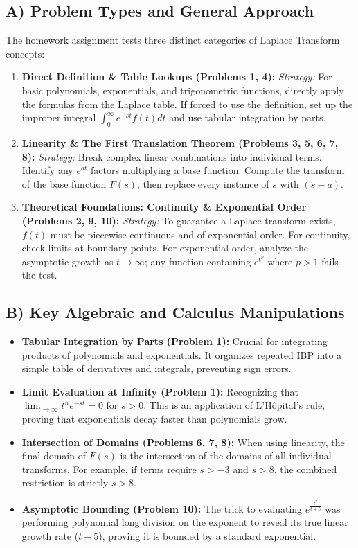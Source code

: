 \documentclass[11pt, a4paper]{article}
\theoremstyle{definition}
\theoremstyle{remark}
\begin{document}
\subsection{A) Problem Types and General Approach}
The homework assignment tests three distinct categories of Laplace Transform concepts:
\begin{enumerate}
    \item \textbf{Direct Definition \& Table Lookups (Problems 1, 4):} 
    \textit{Strategy:} For basic polynomials, exponentials, and trigonometric functions, directly apply the formulas from the Laplace table. If forced to use the definition, set up the improper integral $\int_0^\infty e^{-st}f(t)dt$ and use tabular integration by parts.
    \item \textbf{Linearity \& The First Translation Theorem (Problems 3, 5, 6, 7, 8):}
    \textit{Strategy:} Break complex linear combinations into individual terms. Identify any $e^{at}$ factors multiplying a base function. Compute the transform of the base function $F(s)$, then replace every instance of $s$ with $(s-a)$.
    \item \textbf{Theoretical Foundations: Continuity \& Exponential Order (Problems 2, 9, 10):}
    \textit{Strategy:} To guarantee a Laplace transform exists, $f(t)$ must be piecewise continuous and of exponential order. For continuity, check limits at boundary points. For exponential order, analyze the asymptotic growth as $t \to \infty$; any function containing $e^{t^p}$ where $p > 1$ fails the test.
\end{enumerate}

\subsection{B) Key Algebraic and Calculus Manipulations}
\begin{itemize}
    \item \textbf{Tabular Integration by Parts (Problem 1):} Crucial for integrating products of polynomials and exponentials. It organizes repeated IBP into a simple table of derivatives and integrals, preventing sign errors.
    \item \textbf{Limit Evaluation at Infinity (Problem 1):} Recognizing that $\lim_{t \to \infty} t^n e^{-st} = 0$ for $s > 0$. This is an application of L'Hôpital's rule, proving that exponentials decay faster than polynomials grow.
    \item \textbf{Intersection of Domains (Problems 6, 7, 8):} When using linearity, the final domain of $F(s)$ is the intersection of the domains of all individual transforms. For example, if terms require $s > -3$ and $s > 8$, the combined restriction is strictly $s > 8$.
    \item \textbf{Asymptotic Bounding (Problem 10):} The trick to evaluating $e^{\frac{t^2}{t+5}}$ was performing polynomial long division on the exponent to reveal its true linear growth rate ($t - 5$), proving it is bounded by a standard exponential.
\end{itemize}
\end{document}
